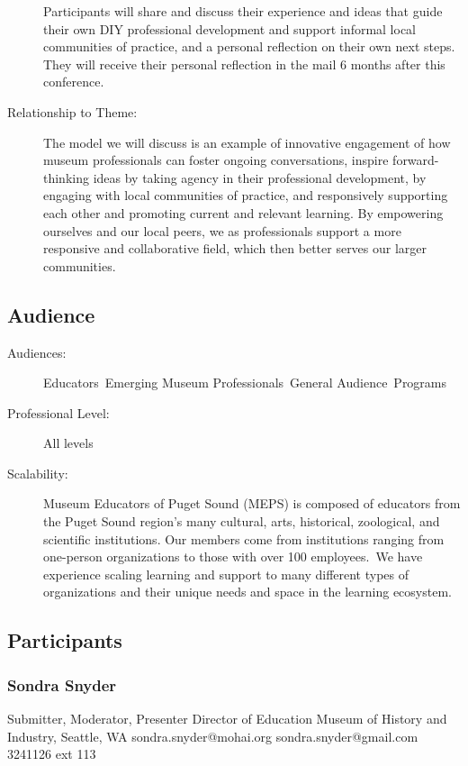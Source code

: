 \documentclass{report}
\begin{document}
\begin{description}
Participants will share and discuss their experience and ideas that guide their own DIY professional development and support informal local communities of practice, and a personal reflection on their own next steps. 
They will receive their personal reflection in the mail 6 months after this conference.
							    \item [Relationship to Theme:]The model we will discuss is an example of innovative engagement of how museum professionals can foster ongoing conversations, inspire forward-thinking ideas by taking agency in their professional development, by engaging with local communities of practice, and responsively supporting each other and promoting current and relevant learning.  
By empowering ourselves and our local peers, we as professionals support a more responsive and collaborative field, which then better serves our larger communities.
							    
                \end{description}
              \subsection*{Audience}
                \begin{description}
                  \item [Audiences:]Educators~Emerging Museum Professionals~General Audience~Programs~
                  \item[Professional Level:]All levels~
                \item[Scalability:] Museum Educators of Puget Sound (MEPS) is composed of educators from the Puget Sound region's many cultural, arts, historical, zoological, and scientific institutions. Our members come from institutions ranging from one-person organizations to those with over 100 employees. We have experience scaling learning and support to many different types of organizations and their unique needs and space in the learning ecosystem.

							
              \end{description}
            \subsection*{Participants}
              \subsubsection*{ Sondra  Snyder }
              Submitter, Moderator, Presenter\newline
              Director of Education\newline
              Museum of History and Industry, Seattle, WA
              \newline
              sondra.snyder@mohai.org\newline
              sondra.snyder@gmail.com 3241126 ext 113\newline
\end{document}
